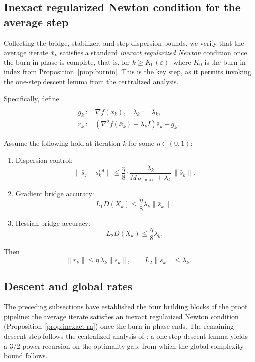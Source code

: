 \documentclass[review,onefignum,onetabnum]{siamart171218}
\begin{document}
\subsection{Inexact regularized Newton condition for the average step}\label{ssec:inexact}
Collecting the bridge, stabilizer, and step-dispersion bounds, we
verify that the average iterate $\bar x_k$ satisfies a standard
\emph{inexact regularized Newton} condition once the burn-in phase
is complete, that is, for $k\ge K_0(\varepsilon)$, where $K_0$ is the
burn-in index from Proposition~\ref{prop:burnin}.
This is the key step, as it permits invoking the one-step descent
lemma from the centralized analysis.

Specifically, define
\begin{gather*}
g_k:=\nabla f(\bar x_k),\quad
\lambda_k:=\tilde{\bar\lambda}_k,\\
r_k:=(\nabla^2 f(\bar x_k)+\lambda_k I)\bar s_k+g_k.
\end{gather*}

\begin{proposition}\label{prop:inexact-rn}
Assume the following hold at iteration $k$ for some $\eta\in(0,1)$:
\begin{enumerate}[leftmargin=1.2em,itemsep=2pt]
\item Dispersion control:
\[
\|\bar s_k-s_k^{\mathrm{ref}}\|\le \frac{\eta}{8}\cdot \frac{\lambda_k}{M_{H,\max}+\lambda_k}\,\|\bar s_k\|.
\]
\item Gradient bridge accuracy:
\[
L_1D(X_k)\le \frac{\eta}{8}\lambda_k\|\bar s_k\|.
\]
\item Hessian bridge accuracy:
\[
L_2D(X_k)\le \frac{\eta}{8}\lambda_k.
\]
\end{enumerate}
Then
\[
\|r_k\|\le \eta\,\lambda_k\|\bar s_k\|,
\qquad
L_2\|\bar s_k\|\le \lambda_k.
\]
\end{proposition}

\subsection{Descent and global rates}\label{ssec:descent}
The preceding subsections have established the four building blocks
of the proof pipeline: the average
iterate satisfies an inexact regularized Newton condition
(Proposition~\ref{prop:inexact-rn}) once the burn-in phase ends.
The remaining descent step follows the centralized analysis of
\citet{mishchenko2023rn}: a one-step descent lemma yields a
$3/2$-power recursion on the optimality gap, from which the global
complexity bound follows.
\end{document}
